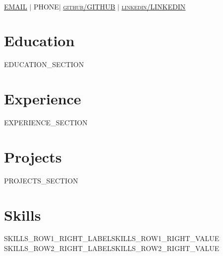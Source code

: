 \documentclass[]{resume-openfont}
\begin{document}
\newcommand{\yourName}{{{NAME}}}
\newcommand{\yourEmail}{{{EMAIL}}}
\newcommand{\yourPhone}{{{PHONE}}}
\newcommand{\githubUserName}{{{GITHUB}}}
\newcommand{\linkedInUserName}{{{LINKEDIN}}}

\begin{center}
    \Huge \scshape \latoRegular{\yourName} \\ \vspace{1pt}
    \small \href{mailto:\yourEmail}{\underline{\yourEmail}}  $|$  \yourPhone $|$
    \href{https://github.com/\githubUserName}{\underline{github/\githubUserName}} $|$
    \href{https://www.linkedin.com/in/\linkedInUserName}{\underline{linkedin/\linkedInUserName}}
\end{center}

\section{Education}
{{EDUCATION_SECTION}}

\section{Experience}
{{EXPERIENCE_SECTION}}

\section{Projects}
\sectionsep

{{PROJECTS_SECTION}}

\section{Skills}

\begin{skillList}
    {{{SKILLS_ROW1_RIGHT_LABEL}}}{{{SKILLS_ROW1_RIGHT_VALUE}}}
    \\
    {{{SKILLS_ROW2_RIGHT_LABEL}}}{{{SKILLS_ROW2_RIGHT_VALUE}}}
\end{skillList}
\end{document}

